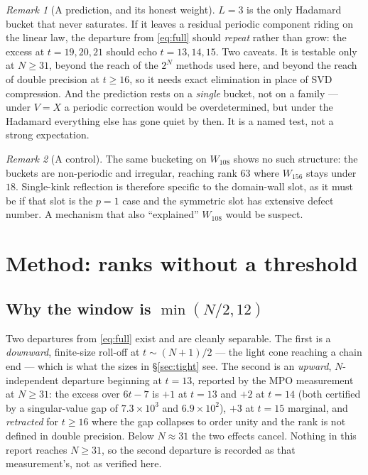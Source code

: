 \documentclass[11pt]{article}
\theoremstyle{plain}
\theoremstyle{remark}
\newtheorem{remark}{Remark}
\begin{document}
\begin{remark}[A prediction, and its honest weight]
$L=3$ is the only Hadamard bucket that never saturates. If it leaves a residual
periodic component riding on the linear law, the departure from \eqref{eq:full}
should \emph{repeat} rather than grow: the excess at $t=19,20,21$ should echo
$t=13,14,15$. Two caveats. It is testable only at $N\ge31$, beyond the reach of
the $2^N$ methods used here, and beyond the reach of double precision at
$t\ge16$, so it needs exact elimination in place of SVD compression. And the
prediction rests on a \emph{single} bucket, not on a family --- under $V=X$ a
periodic correction would be overdetermined, but under the Hadamard everything
else has gone quiet by then. It is a named test, not a strong expectation.
\end{remark}

\begin{remark}[A control]
The same bucketing on $W_{108}$ shows no such structure: the buckets are
non-periodic and irregular, reaching rank $63$ where $W_{156}$ stays under $18$.
Single-kink reflection is therefore specific to the domain-wall slot, as it must
be if that slot is the $p=1$ case and the symmetric slot has extensive defect
number. A mechanism that also ``explained'' $W_{108}$ would be suspect.
\end{remark}

\section{Method: ranks without a threshold}
\label{sec:method}

\subsection{Why the window is $\min(N/2,12)$}

Two departures from \eqref{eq:full} exist and are cleanly separable. The first
is a \emph{downward}, finite-size roll-off at $t\sim(N{+}1)/2$ --- the light cone
reaching a chain end --- which is what the sizes in \S\ref{sec:tight} see. The
second is an \emph{upward}, $N$-independent departure beginning at $t=13$,
reported by the MPO measurement at $N\ge31$: the excess over $6t-7$ is $+1$ at
$t{=}13$ and $+2$ at $t{=}14$ (both certified by a singular-value gap of
$7.3\times10^3$ and $6.9\times10^2$), $+3$ at $t{=}15$ marginal, and
\emph{retracted} for $t\ge16$ where the gap collapses to order unity and the
rank is not defined in double precision. Below $N\approx31$ the two effects
cancel. Nothing in this report reaches $N\ge31$, so the second departure is
recorded as that measurement's, not as verified here.
\end{document}
